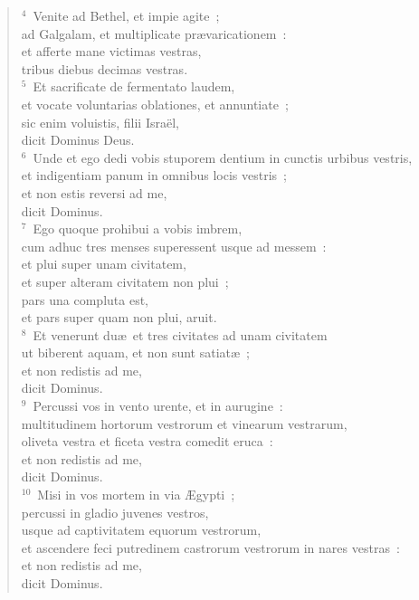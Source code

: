 \begin{flushleft}\begin{verse}${}^{4}$~Venite ad Bethel, et impie agite~;\\ ad Galgalam, et multiplicate pr\ae varicationem~:\\ et afferte mane victimas vestras,\\ tribus diebus decimas vestras.\\
${}^{5}$~Et sacrificate de fermentato laudem,\\ et vocate voluntarias oblationes, et annuntiate~;\\ sic enim voluistis, filii Isra\"el,\\ dicit Dominus Deus.\\
${}^{6}$~Unde et ego dedi vobis stuporem dentium in cunctis urbibus vestris,\\ et indigentiam panum in omnibus locis vestris~;\\ et non estis reversi ad me,\\ dicit Dominus.\\
${}^{7}$~Ego quoque prohibui a vobis imbrem,\\ cum adhuc tres menses superessent usque ad messem~:\\ et plui super unam civitatem,\\ et super alteram civitatem non plui~;\\ pars una compluta est,\\ et pars super quam non plui, aruit.\\
${}^{8}$~Et venerunt du\ae\ et tres civitates ad unam civitatem\\ ut biberent aquam, et non sunt satiat\ae~;\\ et non redistis ad me,\\ dicit Dominus.\\
${}^{9}$~Percussi vos in vento urente, et in aurugine~:\\ multitudinem hortorum vestrorum et vinearum vestrarum,\\ oliveta vestra et ficeta vestra comedit eruca~:\\ et non redistis ad me,\\ dicit Dominus.\\
${}^{10}$~Misi in vos mortem in via \AE gypti~;\\ percussi in gladio juvenes vestros,\\ usque ad captivitatem equorum vestrorum,\\ et ascendere feci putredinem castrorum vestrorum in nares vestras~:\\ et non redistis ad me,\\ dicit Dominus.\\

\end{verse}
\end{flushleft}
